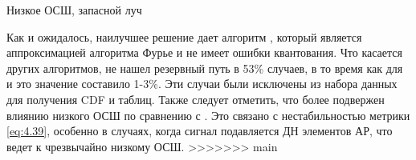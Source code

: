 \begin{table}[H]
  \begin{center}
    \caption{Низкое ОСШ, запасной луч}
    \label{tab:multipath:static:LOW-SNR:2}
  \end{center}
\end{table}

Как и ожидалось, наилучшее решение дает алгоритм \hSearchMMSE{}, который
является аппроксимацией алгоритма Фурье и не имеет ошибки квантования. Что
касается других алгоритмов, \ACS{} не
нашел резервный путь в 53\% случаев, в то время как  для \AuxBeam{} и \hSearchMMSE{} 
это значение составило 1-3\%.  Эти случаи были исключены из набора
данных для получения CDF и таблиц. Также следует отметить, что \AuxBeam{}
более подвержен влиянию низкого ОСШ по сравнению с \hSearchMMSE{}. 
Это связано с нестабильностью метрики \eqref{eq:4.39}, особенно в случаях, когда 
сигнал подавляется ДН элементов АР, что ведет к чрезвычайно низкому ОСШ.
>>>>>>> main

